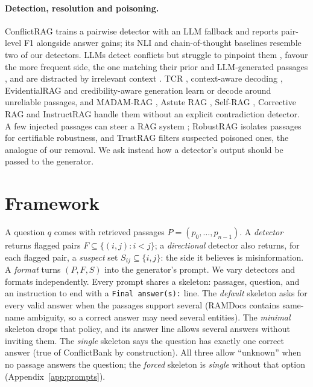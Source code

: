 \paragraph{Detection, resolution and poisoning.}
ConflictRAG \citep{wang2026conflictrag} trains a pairwise detector with an LLM fallback and reports pair-level F1
alongside answer gains; its NLI and chain-of-thought baselines resemble two of our detectors. LLMs detect conflicts but struggle to pinpoint them
\citep{gokul2025contradiction,wang2024resolving,jiayang2024econ}, favour the more frequent side, the one matching
their prior and LLM-generated passages \citep{jin2024tugofwar,kortukov2024realistic,tan2024blinded}, and are
distracted by irrelevant context \citep{shi2023distracted,schuster2026whose}. TCR \citep{ye2026tcr}, context-aware
decoding \citep{shi2024cad}, EvidentialRAG \citep{hossain2026evidentialrag} and credibility-aware generation
\citep{pan2024credibility} learn or decode around unreliable passages, and MADAM-RAG \citep{wang2025madam}, Astute RAG
\citep{wang2025astute}, Self-RAG \citep{asai2024selfrag}, Corrective RAG \citep{yan2024crag} and InstructRAG
\citep{wei2025instructrag} handle them without an explicit contradiction detector. A few injected passages can steer a RAG
system \citep{zou2025poisonedrag}; RobustRAG \citep{xiang2024robustrag} isolates passages for certifiable robustness,
and TrustRAG \citep{zhou2025trustrag} filters suspected poisoned ones, the analogue of our removal. We ask instead how
a detector's output should be passed to the generator.
\section{Framework}
\label{sec:method}

A question $q$ comes with retrieved passages $P=(p_0,\dots,p_{n-1})$. A \emph{detector} returns flagged pairs
$F\subseteq\{(i,j): i<j\}$; a \emph{directional} detector also returns, for each flagged pair, a \emph{suspect}
set $S_{ij}\subseteq\{i,j\}$: the side it believes is misinformation. A \emph{format} turns $(P,F,S)$ into the
generator's prompt. We vary detectors and formats independently. Every prompt shares a skeleton: passages, question,
and an instruction to end with a \texttt{Final answer(s):} line. The \emph{default} skeleton asks for every valid
answer when the passages support several (RAMDocs contains same-name ambiguity, so a correct answer may need several
entities). The \emph{minimal} skeleton drops that policy, and its answer line allows several answers without inviting
them. The \emph{single} skeleton says the question has exactly one correct answer (true of ConflictBank by
construction). All three allow ``unknown'' when no passage answers the question; the \emph{forced} skeleton is
\emph{single} without that option (Appendix~\ref{app:prompts}).

